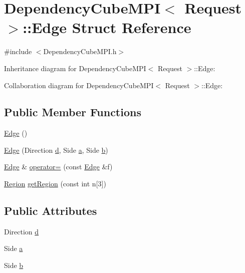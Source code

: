 \hypertarget{struct_dependency_cube_m_p_i_1_1_edge}{}\section{Dependency\+Cube\+M\+P\+I$<$ Request $>$\+:\+:Edge Struct Reference}
\label{struct_dependency_cube_m_p_i_1_1_edge}


{\ttfamily \#include $<$Dependency\+Cube\+M\+P\+I.\+h$>$}



Inheritance diagram for Dependency\+Cube\+M\+P\+I$<$ Request $>$\+:\+:Edge\+:


Collaboration diagram for Dependency\+Cube\+M\+P\+I$<$ Request $>$\+:\+:Edge\+:
\subsection*{Public Member Functions}
\begin{DoxyCompactItemize}
\item 
\hyperlink{struct_dependency_cube_m_p_i_1_1_edge_a4300ae373dfb130d69654ba7dc54b42c}{Edge} ()
\item 
\hyperlink{struct_dependency_cube_m_p_i_1_1_edge_aa9e7ee251e0259c647dc41a193e1cf6f}{Edge} (Direction \hyperlink{struct_dependency_cube_m_p_i_1_1_edge_a8669784b9f597960def87cc96ebd0e1f}{d}, Side \hyperlink{struct_dependency_cube_m_p_i_1_1_edge_a08c5f45fa42aa4b3d2177c07f00eb076}{a}, Side \hyperlink{struct_dependency_cube_m_p_i_1_1_edge_a017525e4ab3ec35aa19a4de2c7b6ebc1}{b})
\item 
\hyperlink{struct_dependency_cube_m_p_i_1_1_edge}{Edge} \& \hyperlink{struct_dependency_cube_m_p_i_1_1_edge_a5c268dbc2c12757dadfc0416efc468a1}{operator=} (const \hyperlink{struct_dependency_cube_m_p_i_1_1_edge}{Edge} \&f)
\item 
\hyperlink{struct_region}{Region} \hyperlink{struct_dependency_cube_m_p_i_1_1_edge_a8964aa3679c17660a3647a83514c348d}{get\+Region} (const int n\mbox{[}3\mbox{]})
\end{DoxyCompactItemize}
\subsection*{Public Attributes}
\begin{DoxyCompactItemize}
\item 
Direction \hyperlink{struct_dependency_cube_m_p_i_1_1_edge_a8669784b9f597960def87cc96ebd0e1f}{d}
\item 
Side \hyperlink{struct_dependency_cube_m_p_i_1_1_edge_a08c5f45fa42aa4b3d2177c07f00eb076}{a}
\item 
Side \hyperlink{struct_dependency_cube_m_p_i_1_1_edge_a017525e4ab3ec35aa19a4de2c7b6ebc1}{b}
\end{DoxyCompactItemize}


